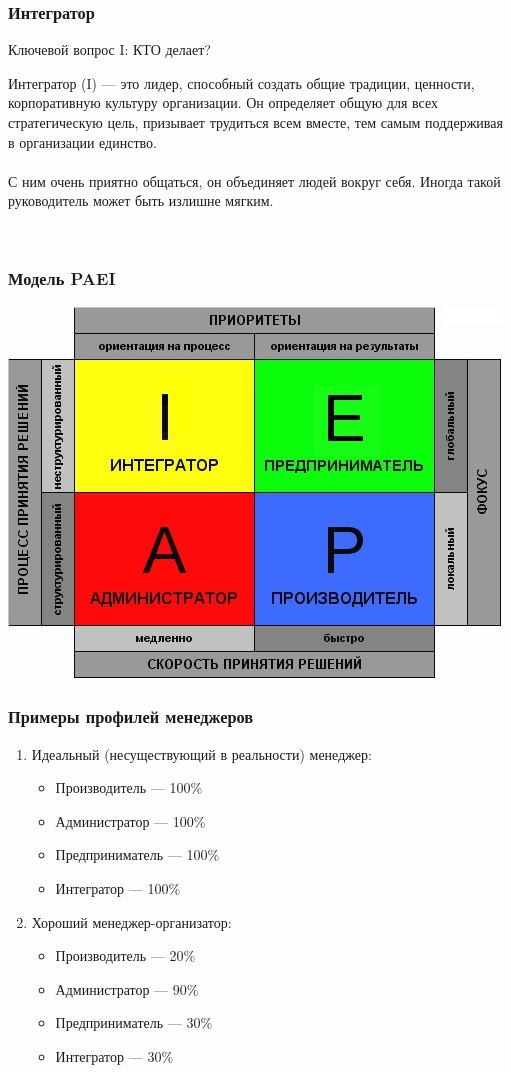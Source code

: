 \documentclass{../industrial-development}
\begin{document}
{{{{{{{{{{{{{{{\begin{frame} \frametitle{Интегратор}
	\begin{block}{Ключевой вопрос I:}
		КТО делает?
	\end{block}	
Интегратор (I) — это лидер, способный создать общие традиции, ценности, корпоративную культуру организации. Он определяет общую для всех стратегическую цель, призывает трудиться всем вместе, тем самым поддерживая в организации единство. \\~\\ С ним очень приятно общаться, он объединяет людей вокруг себя. Иногда такой руководитель может быть излишне мягким.
\end{frame}
\lecturenotes
~\cite{How_to_be_a_good_IT-manager}

\begin{frame} \frametitle{Модель PAEI}
{\includegraphics[width=0.95\linewidth]{paei.png}}
\end{frame}
\lecturenotes

\begin{frame} \frametitle{Примеры профилей менеджеров }
	\begin{enumerate}
\item Идеальный (несуществующий в реальности) менеджер: 
		 \begin{itemize}
                     \item Производитель — 100\%
 		 \item Администратор — 100\%
 		 \item Предприниматель — 100\%
		\item Интегратор — 100\%
		\end{itemize} 
\item Хороший менеджер-организатор:	
		 \begin{itemize}
                         \item Производитель — 20\%
 		 \item Администратор — 90\%
 		 \item Предприниматель — 30\%
		\item Интегратор — 30\%
		\end{itemize} 
\end{enumerate}
\end{frame}
\lecturenotes
~\cite{How_to_be_a_good_IT-manager}

}}}}}}}}}}}}}}}
\end{document}
